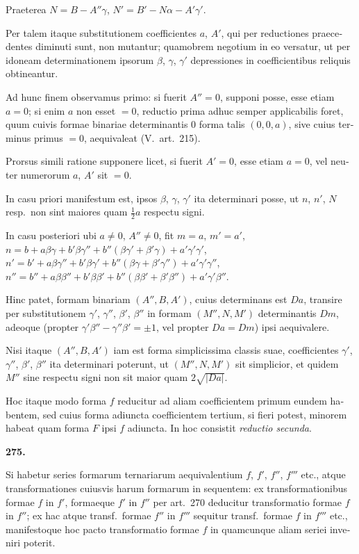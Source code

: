 \documentclass[12pt,a4paper]{article}
\theoremstyle{plain}
\theoremstyle{definition}
\theoremstyle{remark}
\begin{document}
\begin{otherlanguage}{latin}
Praeterea $N = B - A''\gamma$, $N' = B' - N\alpha - A'\gamma'$.

Per talem itaque substitutionem coefficientes $a$, $A'$, qui per reductiones praecedentes diminuti sunt, non mutantur; quamobrem negotium in eo versatur, ut per idoneam determinationem ipsorum $\beta$, $\gamma$, $\gamma'$ depressiones in coefficientibus reliquis obtineantur.

Ad hunc finem observamus primo: si fuerit $A'' = 0$, supponi posse, esse etiam $a = 0$; si enim $a$ non esset $= 0$, reductio prima adhuc semper applicabilis foret, quum cuivis formae binariae determinantis $0$ forma talis $(0, 0, a)$, sive cuius terminus primus $= 0$, aequivaleat (V.\ art.\ 215).

Prorsus simili ratione supponere licet, si fuerit $A' = 0$, esse etiam $a = 0$, vel neuter numerorum $a$, $A'$ sit $= 0$.

In casu priori manifestum est, ipsos $\beta$, $\gamma$, $\gamma'$ ita determinari posse, ut $n$, $n'$, $N$ resp.\ non sint maiores quam $\frac{1}{2}a$ respectu signi.

In casu posteriori ubi $a \neq 0$, $A'' \neq 0$, fit $m = a$, $m' = a'$, $n = b + a\beta\gamma + b'\beta\gamma'' + b''(\beta\gamma' + \beta'\gamma) + a'\gamma'\gamma'$, $n' = b' + a\beta\gamma'' + b'\beta\gamma' + b''(\beta\gamma + \beta'\gamma'') + a'\gamma'\gamma''$, $n'' = b'' + a\beta\beta'' + b'\beta\beta' + b''(\beta\beta' + \beta'\beta'') + a'\gamma'\beta''$.

Hinc patet, formam binariam $(A'', B, A')$, cuius determinans est $Da$, transire per substitutionem $\gamma'$, $\gamma''$, $\beta'$, $\beta''$ in formam $(M'', N, M')$ determinantis $Dm$, adeoque (propter $\gamma'\beta'' - \gamma''\beta' = \pm 1$, vel propter $Da = Dm$) ipsi aequivalere.

Nisi itaque $(A'', B, A')$ iam est forma simplicissima classis suae, coefficientes $\gamma'$, $\gamma''$, $\beta'$, $\beta''$ ita determinari poterunt, ut $(M'', N, M')$ sit simplicior, et quidem $M''$ sine respectu signi non sit maior quam $2\sqrt{|Da|}$.

Hoc itaque modo forma $f$ reducitur ad aliam coefficientem primum eundem habentem, sed cuius forma adiuncta coefficientem tertium, si fieri potest, minorem habeat quam forma $F$ ipsi $f$ adiuncta. In hoc consistit \emph{reductio secunda}.

\bigskip

\textbf{275.}

Si habetur series formarum ternariarum aequivalentium $f$, $f'$, $f''$, $f'''$ etc., atque transformationes cuiusvis harum formarum in sequentem: ex transformationibus formae $f$ in $f'$, formaeque $f'$ in $f''$ per art.\ 270 deducitur transformatio formae $f$ in $f''$; ex hac atque transf.\ formae $f''$ in $f'''$ sequitur transf.\ formae $f$ in $f'''$ etc., manifestoque hoc pacto transformatio formae $f$ in quamcunque aliam seriei inveniri poterit.


\end{otherlanguage}
\end{document}
